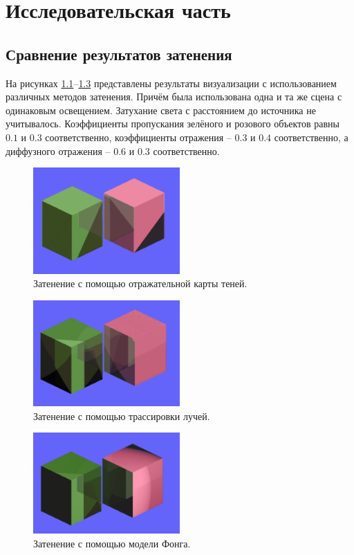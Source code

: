 \chapter{Исследовательская часть}

\section{Сравнение результатов затенения}
На рисунках \ref{img:rsm}--\ref{img:fong} представлены результаты
визуализации с использованием различных методов затенения.
Причём была использована одна и та же сцена с одинаковым освещением.
Затухание света с расстоянием до источника не учитывалось.
Коэффициенты пропускания зелёного и розового объектов равны $0.1$ и $0.3$
соответственно, коэффициенты отражения -- $0.3$ и $0.4$ соответственно,
а диффузного отражения -- $0.6$ и $0.3$ соответственно.

\begin{figure}[H]
	\centering
	\includegraphics[width=0.5\textwidth]{img/rsm.png}
	\caption{Затенение с помощью отражательной карты теней.}
	\label{img:rsm}
\end{figure}

\begin{figure}[H]
	\centering
	\includegraphics[width=0.5\textwidth]{img/tracing.png}
	\caption{Затенение с помощью трассировки лучей.}
	\label{img:tracing}
\end{figure}

\begin{figure}[H]
	\centering
	\includegraphics[width=0.5\textwidth]{img/fong.png}
	\caption{Затенение с помощью модели Фонга.}
	\label{img:fong}
\end{figure}

